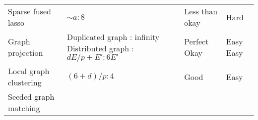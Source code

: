 \documentclass[10pt,oneside]{memoir}
\begin{document}
\begin{longtable}[]{@{}llll@{}}
\begin{minipage}[t]{0.25\columnwidth}
Sparse fused lasso\strut
\end{minipage} & \begin{minipage}[t]{0.37\columnwidth}\raggedright
\(\sim a:8\)\strut
\end{minipage} & \begin{minipage}[t]{0.12\columnwidth}\raggedright
Less than okay\strut
\end{minipage} & \begin{minipage}[t]{0.14\columnwidth}\raggedright
Hard\strut
\end{minipage}\tabularnewline
\begin{minipage}[t]{0.25\columnwidth}\raggedright
Graph projection\strut
\end{minipage} & \begin{minipage}[t]{0.37\columnwidth}\raggedright
Duplicated graph : infinity \linebreak Distributed graph :
\(dE/p + E' : 6E'\)\strut
\end{minipage} & \begin{minipage}[t]{0.12\columnwidth}\raggedright
Perfect \linebreak Okay\strut
\end{minipage} & \begin{minipage}[t]{0.14\columnwidth}\raggedright
Easy \linebreak Easy\strut
\end{minipage}\tabularnewline
\begin{minipage}[t]{0.25\columnwidth}\raggedright
Local graph clustering\strut
\end{minipage} & \begin{minipage}[t]{0.37\columnwidth}\raggedright
\((6 + d)/p : 4\)\strut
\end{minipage} & \begin{minipage}[t]{0.12\columnwidth}\raggedright
Good\strut
\end{minipage} & \begin{minipage}[t]{0.14\columnwidth}\raggedright
Easy\strut
\end{minipage}\tabularnewline
\begin{minipage}[t]{0.25\columnwidth}\raggedright
Seeded graph matching\strut
\end{minipage} & \begin{minipage}[t]{0.37\columnwidth}\raggedright
\strut
\end{minipage} & \begin{minipage}[t]{0.12\columnwidth}\raggedright
\strut
\end{minipage} & \begin{minipage}[t]{0.14\columnwidth}\raggedright

\end{minipage}
\end{longtable}
\end{document}
